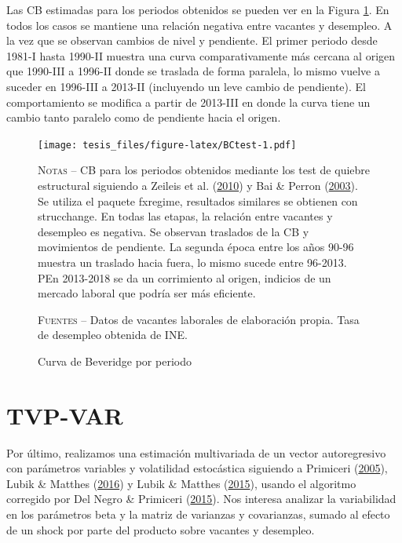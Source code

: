 \documentclass[12pt,oneside]{reedthesis}
\begin{document}
Las CB estimadas para los periodos obtenidos se pueden ver en la Figura \ref{fig:BCtest}. En todos los casos se mantiene una relación negativa entre vacantes y desempleo. A la vez que se observan cambios de nivel y pendiente. El primer periodo desde 1981-I hasta 1990-II muestra una curva comparativamente más cercana al origen que 1990-III a 1996-II donde se traslada de forma paralela, lo mismo vuelve a suceder en 1996-III a 2013-II (incluyendo un leve cambio de pendiente). El comportamiento se modifica a partir de 2013-III en donde la curva tiene un cambio tanto paralelo como de pendiente hacia el origen.
\begin{figure}
\texttt{[image: tesis\_files/figure-latex/BCtest-1.pdf]}
\caption{Curva de Beveridge por periodo}\label{fig:BCtest}\textsc{}

\footnotesize\textsc{Notas} -- CB para los periodos obtenidos mediante los test de quiebre estructural siguiendo a Zeileis et al. (\protect\hyperlink{ref-Zeileis2010}{2010}) y Bai \& Perron (\protect\hyperlink{ref-BaiPerron2003}{2003}). Se utiliza el paquete fxregime, resultados similares se obtienen con strucchange. En todas las etapas, la relación entre vacantes y desempleo es negativa. Se observan traslados de la CB y movimientos de pendiente. La segunda época entre los años 90-96 muestra un traslado hacia fuera, lo mismo sucede entre 96-2013. PEn 2013-2018 se da un corrimiento al origen, indicios de un mercado laboral que podría ser más eficiente.

\textsc{Fuentes} -- Datos de vacantes laborales de elaboración propia. Tasa de desempleo obtenida de INE.
\end{figure}
\hypertarget{tvp-var-1}{%
\section{TVP-VAR}\label{tvp-var-1}}

Por último, realizamos una estimación multivariada de un vector autoregresivo con parámetros variables y volatilidad estocástica siguiendo a Primiceri (\protect\hyperlink{ref-Primiceri2005}{2005}), Lubik \& Matthes (\protect\hyperlink{ref-Lubik2016}{2016}) y Lubik \& Matthes (\protect\hyperlink{ref-Lubik2016b}{2015}), usando el algoritmo corregido por Del Negro \& Primiceri (\protect\hyperlink{ref-DelNegro2015}{2015}). Nos interesa analizar la variabilidad en los parámetros beta y la matriz de varianzas y covarianzas, sumado al efecto de un shock por parte del producto sobre vacantes y desempleo.
\end{document}
